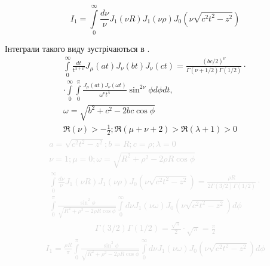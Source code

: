 \begin{equation*}
I_1 = \int\limits_{0}^{\infty} \frac{d\nu}{\nu} 
J_1 \left( \nu R \right) J_1 \left( \nu \rho \right) 
J_0 \left( \nu \sqrt{c^2 t^2 - z^2} \right)
\end{equation*}

Інтеграли такого виду зустрічаються в \cite[ст. 398]{Watson1922}.
\begin{equation} \begin{aligned} \label{eq:intJJJtable}
\int\limits_{0}^{\infty} \frac{d t}{t^{\lambda + \nu}} 
J_\mu \left( at \right) J_\nu \left( bt \right) J_\nu \left( ct \right) =
\frac{ \left( bc/2 \right) ^\nu }
{ \Gamma \left( \nu + 1/2 \right) \Gamma \left( 1/2 \right) } \cdot \\
\cdot \int\limits_{0}^{\infty} \int\limits_{0}^{\pi}
\frac{J_\mu \left( at \right) J_\nu \left( \omega t \right)}
{\omega^\nu t^\lambda} \sin^{2\nu}{\phi} d\phi dt, \\
\omega = \sqrt{b^2 + c^2 - 2bc \cos \phi} \\
\Re \left( \nu \right) > - \frac{1}{2};
\Re \left( \mu + \nu + 2 \right) > \Re \left( \lambda + 1 \right) > 0
\end{aligned} \end{equation}
%
\textcolor{lightgray}{ \begin{equation*} \begin{aligned}
a = \sqrt{c^2 t^2 - z^2}; b = R; c = \rho; \lambda = 0 \\
\nu = 1; \mu = 0; \omega = \sqrt{R^2 + \rho^2 - 2 \rho R \cos \phi} \\
\int\limits_{0}^{\infty} \frac{d\nu}{\nu} 
J_1 \left( \nu R \right) J_1 \left( \nu \rho \right) 
J_0 \left( \nu \sqrt{c^2 t^2 - z^2} \right) = 
\frac{\rho R}{ 2 \Gamma \left( 3/2 \right) \Gamma \left( 1/2 \right) } \cdot \\
\int\limits_{0}^{\pi} 
\frac{\sin^2{\phi}}{\sqrt{R^2 + \rho^2 - 2 \rho R \cos \phi}}
\int\limits_{0}^{\infty} d \nu J_1 \left( \nu \omega \right) 
J_0 \left( \nu \sqrt{c^2 t^2 - z^2} \right) d \phi
\end{aligned} \end{equation*} }
%
\textcolor{lightgray}{ \begin{equation*} \begin{aligned}
\Gamma \left( 3/2 \right) \Gamma \left( 1/2 \right) = 
\frac{\sqrt{\pi}}{2} \cdot \sqrt{\pi} = \frac{\pi}{2} 
\end{aligned} \end{equation*} }
%
\textcolor{lightgray}{ \begin{equation*} \begin{aligned}
I_1 = \frac{\rho R}{\pi} \int\limits_{0}^{\pi} 
\frac{\sin^2{\phi}}{\sqrt{R^2 + \rho^2 - 2 \rho R \cos \phi}}
\int\limits_{0}^{\infty} d \nu J_1 \left( \nu \omega \right) 
J_0 \left( \nu \sqrt{c^2 t^2 - z^2} \right) d \phi
\end{aligned} \end{equation*} }

